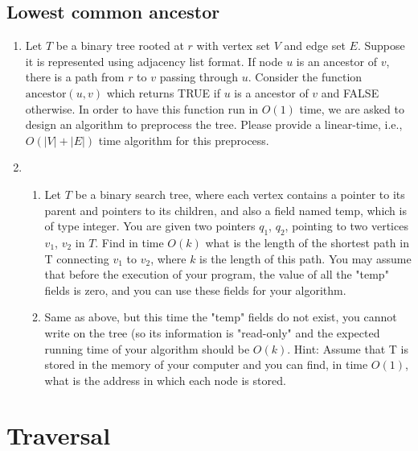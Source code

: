 \begin{refsection}
\subsection{Lowest common ancestor}
\begin{Exercise}
\begin{enumerate}
\item Let $T$ be a binary tree rooted at $r$ with vertex set $V$ and edge set $E$. Suppose it is represented using adjacency list format. If node $u$ is an ancestor of $v$, there is a path from $r$ to $v$ passing through $u$. Consider the function $\text{ancestor}(u, v)$ which returns TRUE if $u$ is a ancestor of $v$ and FALSE otherwise. In order to have this function run in $O(1)$ time, we are asked to design an algorithm to preprocess the tree. Please provide a linear-time, i.e., $O(|V| + |E|)$ time algorithm for this preprocess. 
\item \begin{enumerate}
\item Let $T$ be a binary search tree, where each vertex contains a pointer to its parent and pointers to its children, and also a field named temp, which is of type integer. You are given two pointers $q_1$, $q_2$, pointing to two vertices $v_1$, $v_2$ in $T$. Find in time $O(k)$ what is the length of the shortest path in T connecting $v_1$ to $v_2$, where $k$ is the length of this path. You may assume that before the execution of your program, the value of all the "temp" fields is zero, and you can use these fields for your algorithm.
\item Same as above, but this time the "temp" fields do not exist, you cannot write on the tree (so its information is "read-only" and the expected running time of your algorithm should be $O(k)$.
Hint: Assume that T is stored in the memory of your computer and you can find, in time $O(1)$, what is the address in which each node is stored. 
\end{enumerate}
\end{enumerate}
\end{Exercise}
\begin{Answer}
\end{Answer}

\section{Traversal}

\end{refsection}
